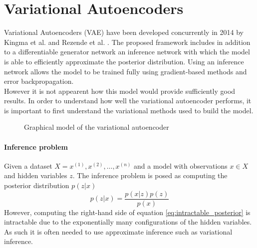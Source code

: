 \section{Variational Autoencoders}
\label{sec:vae}
Variational Autoencoders (VAE) have been developed concurrently in 2014 by Kingma et al. \cite{vae:2014} and Rezende et al. \cite{dlgm:2014}.
The proposed framework includes in addition to a differentiable generator network an inference network with which the model is able to efficiently approximate the posterior distribution.
Using an inference network allows the model to be trained fully using gradient-based methods and error backpropagation.\\

However it is not appearent how this model would provide sufficiently good results. In order to understand how well the variational autoencoder performs, it is important to first understand the variational methods used to build the model.

\begin{figure}[htb]
\centering
\resizebox{5cm}{!}{}
  \caption{Graphical model of the variational autoencoder \cite{vae:2014}}
  \label{fig:vae_architecture}
\end{figure}




\paragraph{Inference problem}
Given a dataset $X = { x^{(1)}, x^{(2)}, \dots, x^{(n)}}$ and a model with observations $x \in X$ and hidden variables $z$. The inference problem is posed as computing the posterior distribution $p(z|x)$ 
\begin{equation}
  \label{eq:intractable_posterior}
  p(z|x) = \frac{p(x|z) p(z)}{p(x)}
\end{equation}
However, computing the right-hand side of equation \ref{eq:intractable_posterior} is intractable due to the exponentially many configurations of the hidden variables. As such it is often needed to use approximate inference such as variational inference.

